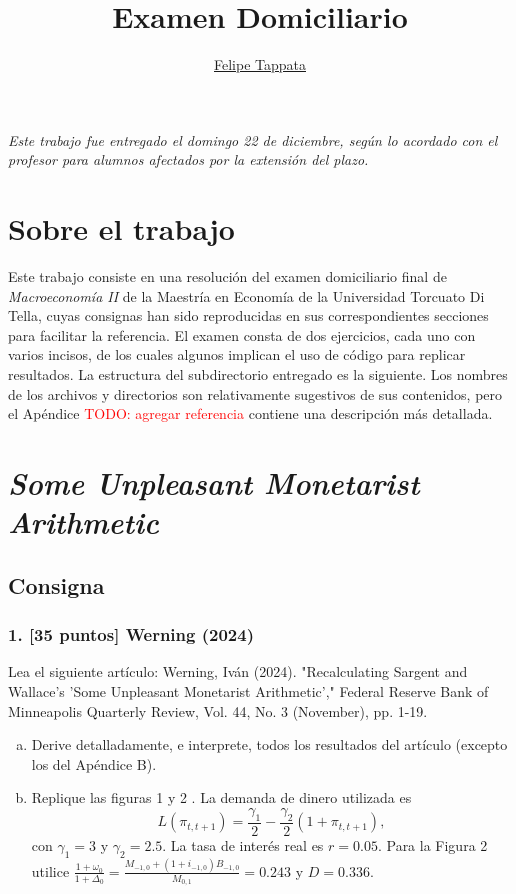 \documentclass[10pt,a4paper]{article}
\author{\href{mailto:felipetappata@gmail.com}{Felipe Tappata}}
\title{Examen Domiciliario}
\begin{document}
\maketitle

\noindent\textit{Este trabajo fue entregado el domingo 22 de diciembre, según lo acordado con el profesor para alumnos afectados por la extensión del plazo.}
\section{Sobre el trabajo}
Este trabajo consiste en una resolución del examen domiciliario final de \emph{Macroeconomía II} de la Maestría en Economía de la Universidad Torcuato Di Tella, cuyas consignas han sido reproducidas en sus correspondientes secciones para facilitar la referencia.
El examen consta de dos ejercicios, cada uno con varios incisos, de los cuales algunos implican el uso de código para replicar resultados.
La estructura del subdirectorio entregado es la siguiente.
Los nombres de los archivos y directorios son relativamente sugestivos de sus contenidos, pero el Apéndice \textcolor{red}{TODO: agregar referencia} contiene una descripción más detallada.
\section[Some Unpleasant Monetarist Arithmetic]{\emph{Some Unpleasant Monetarist Arithmetic}}
\subsection{Consigna}
\begin{mdframed}
	\subsubsection[Ejercicio 1]{1. [35 puntos] Werning (2024)}
	Lea el siguiente artículo:
	Werning, Iván (2024). "Recalculating Sargent and Wallace's 'Some Unpleasant Monetarist Arithmetic'," Federal Reserve Bank of Minneapolis Quarterly Review, Vol. 44, No. 3 (November), pp. 1-19.
	\begin{enumerate}[(a)]
		\item Derive detalladamente, e interprete, todos los resultados del artículo (excepto los del Apéndice B).
		\item Replique las figuras 1 y 2 . La demanda de dinero utilizada es
		      \begin{equation*}
			      L\left(\pi_{t, t+1}\right)=\frac{\gamma_{1}}{2}-\frac{\gamma_{2}}{2}\left(1+\pi_{t, t+1}\right),
		      \end{equation*}
		      con $\gamma_{1}=3$ y $\gamma_{2}=2.5$. La tasa de interés real es $r=0.05$. Para la Figura 2 utilice $\frac{1+\omega_{0}}{1+\Delta_{0}}=\frac{M_{-1,0}+\left(1+i_{-1,0}\right) B_{-1,0}}{M_{0,1}}=0.243$ y $D=0.336$.
	\end{enumerate}
\end{mdframed}
\end{document}
